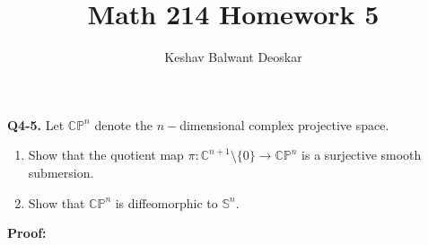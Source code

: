 \documentclass{article}
\title{Math 214 Homework 5}
\author{Keshav Balwant Deoskar}
\newcommand{\C}{\mathbb{C}}
\begin{document}
\maketitle



\textbf{Q4-5.} Let $\mathbb{CP}^n$ denote the $n-$dimensional complex projective space. 
\begin{enumerate}[label=(\alph*)]
  \item Show that the quotient map $\pi : \C^{n+1} \setminus \{0\} \rightarrow \mathbb{CP}^n$ is a surjective smooth submersion.
  \item Show that $\mathbb{CP}^n$ is diffeomorphic to $\mathbb{S}^n$.
\end{enumerate}

\vskip 0.5cm
\textbf{Proof:}
\end{document}
